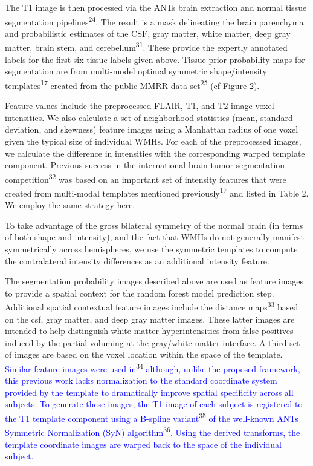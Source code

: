\documentclass[11pt,]{article}
\begin{document}
The T1 image is then processed via the ANTs brain extraction and normal
tissue segmentation pipelines\textsuperscript{24}. The result is a mask
delineating the brain parenchyma and probabilistic estimates of the CSF,
gray matter, white matter, deep gray matter, brain stem, and
cerebellum\textsuperscript{31}. These provide the expertly annotated
labels for the first six tissue labels given above. Tissue prior
probability maps for segmentation are from multi-model optimal symmetric
shape/intensity templates\textsuperscript{17} created from the public
MMRR data set\textsuperscript{25} (cf Figure 2).

Feature values include the preprocessed FLAIR, T1, and T2 image voxel
intensities. We also calculate a set of neighborhood statistics (mean,
standard deviation, and skewness) feature images using a Manhattan
radius of one voxel given the typical size of individual WMHs. For each
of the preprocessed images, we calculate the difference in intensities
with the corresponding warped template component. Previous success in
the international brain tumor segmentation
competition\textsuperscript{32} was based on an important set of
intensity features that were created from multi-modal templates
mentioned previously\textsuperscript{17} and listed in Table 2. We
employ the same strategy here.

To take advantage of the gross bilateral symmetry of the normal brain
(in terms of both shape and intensity), and the fact that WMHs do not
generally manifest symmetrically across hemispheres, we use the
symmetric templates to compute the contralateral intensity differences
as an additional intensity feature.

The segmentation probability images described above are used as feature
images to provide a spatial context for the random forest model
prediction step. Additional spatial contextual feature images include
the distance maps\textsuperscript{33} based on the csf, gray matter, and
deep gray matter images. These latter images are intended to help
distinguish white matter hyperintensities from false positives induced
by the partial voluming at the gray/white matter interface. A third set
of images are based on the voxel location within the space of the
template.
\textcolor{blue}{Similar feature images were used in}\textsuperscript{34}
\textcolor{blue}{although, unlike the proposed framework, this previous work lacks
normalization to the standard
coordinate system provided by the template to dramatically improve spatial specificity
across all subjects.  To generate these images, the T1 image of each subject is
registered to the T1 template component using a B-spline variant}\textsuperscript{35}
\textcolor{blue}{of the well-known ANTs Symmetric Normalization (SyN) algorithm}\textsuperscript{36}.
\textcolor{blue}{Using the derived transforms, the template coordinate images are warped back to the space of the individual subject.}
\end{document}
